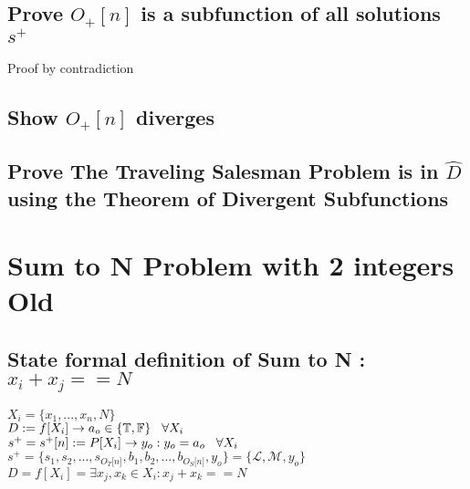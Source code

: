 \documentclass[11pt]{article}
\begin{document}
\subsection{Prove $O_{+}[n]$ is a subfunction of all solutions $s^+$}
Proof by contradiction
\subsection{Show $O_{+}[n]$ diverges}
\subsection{Prove The Traveling Salesman Problem is in $\hat{D}$ using the Theorem of Divergent Subfunctions}
















\section{Sum to N Problem with 2 integers Old}

\subsection{State formal definition of Sum to N : $x_i + x_j == N$}
\begin{center}
\vspace{1.5mm}
$
X_i = \{x_1,...,x_n,N\}
$
\\ \vspace{2mm}
$
D := f \lbrack X_i \rbrack \rightarrow a_{o} \in \{\mathbb{T}, \mathbb{F}\} \hspace{3mm} \forall X_i
$
\\ \vspace{2mm}
$
s^+ = s^+\lbrack n \rbrack := P \lbrack X_i \rbrack \rightarrow y_{o} : y_o = a_{o} \hspace{3mm} \forall X_i
$
\\ \vspace{2mm}
$
s^+ = \{ s_1,s_2,...,s_{O_T \lbrack n \rbrack }, b_1, b_2,...,b_{O_S \lbrack n \rbrack},y_o \} = \{ \mathcal{L},\mathcal{M},y_o\}
$
\\ \vspace{6mm}
$
D = f[X_i] = \exists x_j,x_k \in X_i : x_j + x_k == N
$
\end{center}
\end{document}
